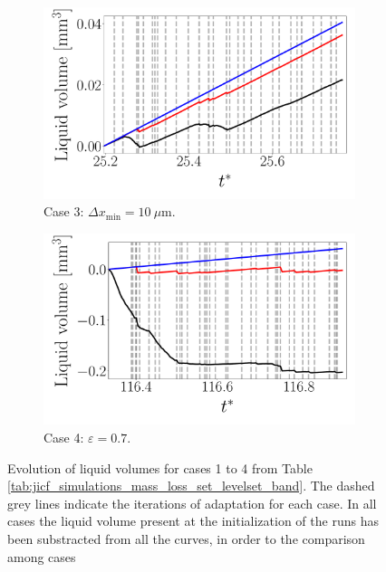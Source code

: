 \begin{figure}[ht]
\begin{subfigure}[b]{0.45\textwidth}
	\flushleft
   \includegraphics[scale=0.24]{./part2_developments/figures_ch5_resolved_JICF/flow_rates_mass_loss_set_levelset_band/vl_loss_case_dx10}
   \vspace*{-0.2in}
   \caption{Case 3: $\Delta x_\mathrm{min} = 10~\mu$m.}
\end{subfigure}
\hfill
\begin{subfigure}[b]{0.45\textwidth}
	\centering
   \includegraphics[scale=0.24]{./part2_developments/figures_ch5_resolved_JICF/flow_rates_mass_loss_set_levelset_band/vl_loss_case_epsilon}
   \vspace*{-0.2in}
   \caption{Case 4: $\varepsilon = 0.7$.}
\end{subfigure}


   \caption[Evolution of liquid volumes]{Evolution of liquid volumes for cases 1 to 4 from Table \ref{tab:jicf_simulations_mass_loss_set_levelset_band}. The dashed grey lines indicate the iterations of adaptation for each case. In all cases the liquid volume present at the initialization of the runs has been substracted from all the curves, in order to the comparison among cases}
\label{fig:JICF_liquid_evolution_loss_due_to_set_levelset_band}
\end{figure}


